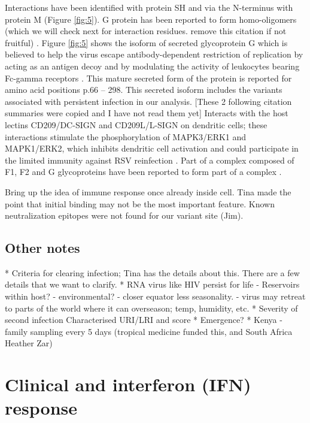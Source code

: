 \documentclass{article}
\begin{document}
Interactions  have been identified with protein SH 
\cite{rixon2005respiratory} 
and via the N-terminus with protein M 
\cite{ghildyal2005interaction} (Figure \ref{fig:5}).
G protein has been reported to form homo-oligomers (which we will check next for interaction residues. remove this citation if not fruitful)
\cite{collins1992oligomerization}.
Figure \ref{fig:5} shows the isoform of secreted glycoprotein G which is believed to help the virus escape antibody-dependent restriction of replication by acting as an antigen decoy and by modulating the activity of leukocytes bearing Fc-gamma receptors 
\cite{bukreyev2008secreted}.
This mature secreted form of the protein is reported for amino acid positions p.66 – 298.
This secreted isoform includes the variants associated with persistent infection in our analysis. 
[These 2 following citation summaries were copied and I have not read them yet] Interacts with the host lectins CD209/DC-SIGN and CD209L/L-SIGN on dendritic cells; these interactions stimulate the phosphorylation of MAPK3/ERK1 and MAPK1/ERK2, which inhibits dendritic cell activation and could participate in the limited immunity against RSV reinfection 
\cite{johnson2012respiratory}.
Part of a complex composed of F1, F2 and G glycoproteins have been reported to form part of a complex
\cite{low2008rsv}.

Bring up the idea of immune response once already inside cell. 
Tina made the point that initial binding may not be the most important feature.
Known neutralization epitopes were not found for our variant site (Jim).

\subsection{Other notes}
* Criteria for clearing infection; Tina has the details about this. 
There are a few details that we want to clarify. 
* RNA virus like HIV persist for life
	- Reservoirs within host?
	- environmental?
	- closer equator less seasonality.
	- virus may retreat to parts of the world where it can overseason; temp, humidity, etc.
* Severity of second infection
	Characterised URI/LRI and score
* Emergence?
* Kenya - family sampling every 5 days (tropical medicine funded this, and South Africa Heather Zar)



\section{Clinical and interferon (IFN) response}
\end{document}
